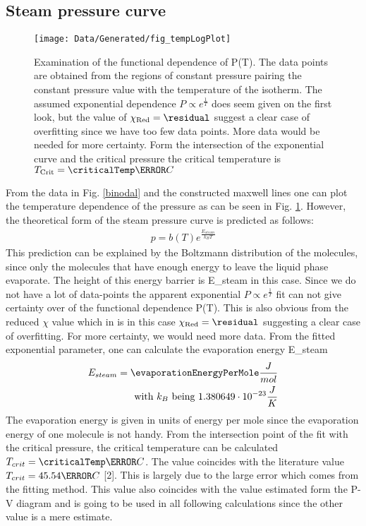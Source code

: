 \documentclass[a4paper,10pt,twocolumn]{article}
\begin{document}
    \subsection{Steam pressure curve}\label{subsec:steamPressureCurve}
    \begin{figure}
        \begin{center}
            \texttt{[image: Data/Generated/fig\_tempLogPlot]}
            \caption[]{Examination of the functional dependence of P(T). The data points are obtained from the regions of constant pressure pairing the constant pressure value with the temperature of the isotherm.
            The assumed exponential dependence $P \propto e^{\frac{1}{T}} $ does seem given on the first look, but the value of $\chi_{\text{Red}}=\residual$ suggest a clear case of overfitting since we have
            too few data points. More data would be needed for more certainty. Form the intersection of the exponential curve and the critical pressure the critical temperature is $T_{\text{Crit}}=\criticalTemp\degree C$}
            \label{fig:tempLogPLot}
        \end{center}
    \end{figure}
    From the data in Fig. \ref{binodal} and the constructed maxwell lines one can plot the temperature dependence of the pressure as can be seen in Fig. \ref{fig:tempLogPLot}.
    However, the theoretical form of the steam pressure curve is predicted as follows:
    \begin{align}
        p=b(T)e^\frac{E_{steam}}{k_B T}
    \end{align}
    This prediction can be explained by the Boltzmann distribution of the molecules, since only the molecules that have enough energy to leave the liquid phase evaporate.
    The height of this energy barrier is E_{steam}\) in this case.
    Since we do not have a lot of data-points the apparent exponential $P \propto e^{\frac{1}{T}} $ fit can not give certainty over of the functional dependence P(T).
    This is also obvious from the reduced $\chi$ value which in is in this case $\chi_{\text{Red}}=\residual$ suggesting a clear case of overfitting.
    For more certainty, we would need more data.
    From the fitted exponential parameter, one can calculate the evaporation energy E_{steam}\)
    \begin{align}
        E_{steam} = \evaporationEnergyPerMole \frac{J}{mol}
        \endline \text{with } k_B \text{ being } 1.380649\cdot 10^{-23}\frac{J}{K}
    \end{align}
    The evaporation energy is given in units of energy per mole since the evaporation energy of one molecule is not handy. 
    From the intersection point of the fit with the critical pressure, the critical temperature can be calculated $T_{crit}=\criticalTemp\degree C $.
    The value coincides with the literature value $T_{crit} = 45.54\degree C$ [2].
    This is largely due to the large error which comes from the fitting method.
    This value also coincides with the value estimated form the P-V diagram and is going to be used in all following calculations since the other value is a mere estimate.
    
\end{document}
